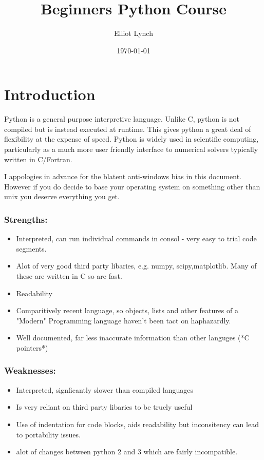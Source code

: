 \documentclass[11pt,a4paper]{article}
\title{Beginners Python Course}
\author{Elliot Lynch}
\date{\today}
\begin{document}
\maketitle

\tableofcontents

\section{Introduction}

Python is a general purpose interpretive language. Unlike C, python is not compiled but is instead executed at runtime. This gives python a great deal of flexibility at the expense of speed. Python is widely used in scientific computing, particularly as a much more user friendly interface to numerical solvers typically written in C/Fortran.

I appologies in advance for the blatent anti-windows bias in this document. However if you do decide to base your operating system on something other than unix you deserve everything you get.

\subsubsection{Strengths:}
\begin{itemize}
\item Interpreted, can run individual commands in consol - very easy to trial code segments.
\item Alot of very good third party libaries, e.g. numpy, scipy,matplotlib. Many of these are written in C so are fast.
\item Readability
\item Comparitively recent language, so objects, lists and other features of a "Modern" Programming language haven't been tact on haphazardly.
\item Well documented, far less inaccurate information than other languges (*C pointers*)
\end{itemize}

\subsubsection{Weaknesses:}
\begin{itemize}
\item Interpreted, signficantly slower than compiled languages
\item Is very reliant on third party libaries to be truely useful
\item Use of indentation for code blocks, aids readability but inconsitency can lead to portability issues.
\item alot of changes between python 2 and 3 which are fairly incompatible.
\end{itemize}
\end{document}
